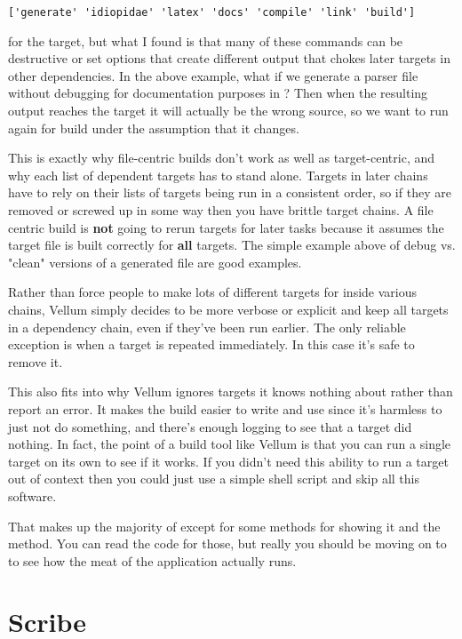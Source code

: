 \verb|['generate' 'idiopidae' 'latex' 'docs' 'compile' 'link' 'build']|

for the  target, but what I found is that many of these commands
can be destructive or set options that create different output that chokes later
targets in other dependencies.  In the above example, what if we generate a
parser file without debugging for documentation purposes in ?  Then
when the resulting output reaches the  target it will actually be
the wrong source, so we want to run  again for build under the
assumption that it changes.

This is exactly why file-centric builds don't work as well as target-centric,
and why each list of dependent targets has to stand alone.  Targets in
later chains have to rely on their lists of targets being run in a
consistent order, so if they are removed or screwed up in some way then you
have brittle target chains.  A file centric build is {\bf not} going to
rerun targets for later tasks because it assumes the target file is built
correctly for {\bf all} targets.  The simple example above of debug vs.
"clean" versions of a generated file are good examples.

Rather than force people to make lots of different targets for inside various
chains, Vellum simply decides to be more verbose or explicit and keep all
targets in a dependency chain, even if they've been run earlier.  The only
reliable exception is when a target is repeated immediately.  In this case it's
safe to remove it.

This also fits into why Vellum ignores targets it knows nothing about rather
than report an error.  It makes the build easier to write and use since it's
harmless to just not do something, and there's enough logging to see that a
target did nothing.  In fact, the point of a build tool like Vellum is that you
can run a single target on its own to see if it works.  If you didn't need this
ability to run a target out of context then you could just use a simple shell
script and skip all this software.

That makes up the majority of  except for some methods for 
showing it and the  method.  You can read the code for those,
but really you should be moving on to  to see how the
meat of the application actually runs.



\section{Scribe}


